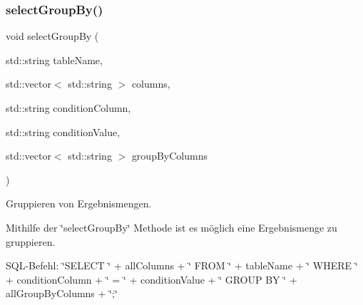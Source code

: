 \subsubsection{select\+Group\+By()}
{\footnotesize\ttfamily void select\+Group\+By (\begin{DoxyParamCaption}\item[{std\+::string}]{table\+Name,  }\item[{std\+::vector$<$ std\+::string $>$}]{columns,  }\item[{std\+::string}]{condition\+Column,  }\item[{std\+::string}]{condition\+Value,  }\item[{std\+::vector$<$ std\+::string $>$}]{group\+By\+Columns }\end{DoxyParamCaption})}



Gruppieren von Ergebnismengen. 

Mithilfe der \char`\"{}select\+Group\+By\char`\"{} Methode ist es möglich eine Ergebnismenge zu gruppieren.~\newline


S\+Q\+L-\/\+Befehl\+: \char`\"{}\+S\+E\+L\+E\+C\+T \char`\"{} + all\+Columns + \char`\"{} F\+R\+O\+M \char`\"{} + table\+Name + \char`\"{} W\+H\+E\+R\+E \char`\"{} + condition\+Column + \char`\"{} = \textquotesingle{}\char`\"{} + condition\+Value + \char`\"{}\textquotesingle{} G\+R\+O\+U\+P B\+Y \char`\"{} + all\+Group\+By\+Columns + \char`\"{};\char`\"{}


